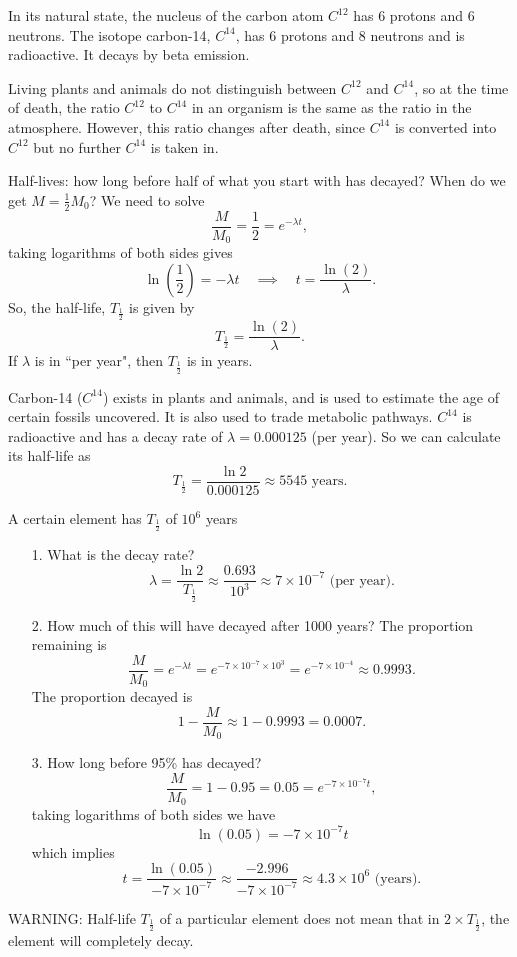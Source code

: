 In its natural state, the nucleus of the carbon atom $C^{12}$ has 6 protons and 6 neutrons. The isotope carbon-14, $C^{14}$, has 6 protons and 8 neutrons and is radioactive. It decays by beta emission.

Living plants and animals do not distinguish between $C^{12}$ and $C^{14}$, so at the time of death, the ratio $C^{12}$ to $C^{14}$ in an organism is the same as the ratio in the atmosphere. However, this ratio changes after death, since $C^{14}$ is converted into $C^{12}$ but no further $C^{14}$ is taken in.

\begin{example}
Half-lives: how long before half of what you start with has decayed? When do we get $M=\frac{1}{2}M_0$? We need to solve
\[\frac{M}{M_0}=\frac{1}{2}=e^{-\lambda t},\]
taking logarithms of both sides gives
\[\ln \left(\frac{1}{2}\right) = -\lambda t \quad \implies \quad t=\frac{\ln \left(2\right)}{\lambda}.\]
So, the half-life, $T_{\frac{1}{2}}$ is given by
\[T_{\frac{1}{2}}=\frac{\ln \left(2\right)}{\lambda}.\]
If $\lambda$ is in ``per year", then $T_{\frac{1}{2}}$ is in years.
\end{example}

\begin{example}
Carbon-14 ($C^{14}$) exists in plants and animals, and is used to estimate the age of certain fossils uncovered. It is also used to trade metabolic pathways. $C^{14}$ is radioactive and has a decay rate of $\lambda=0.000125$ (per year). So we can calculate its half-life as 
\[T_{\frac{1}{2}}=\frac{\ln 2}{0.000125}\approx 5545 \text{ years}.\]
\end{example}

\begin{example}
A certain element has $T_{\frac{1}{2}}$ of $10^6$ years
\begin{itemize} 
\item[1.] What is the decay rate?
\[\lambda=\frac{\ln 2}{T_{\frac{1}{2}}}\approx \frac{0.693}{10^3}\approx 7\times10^{-7} \text{ (per year)}.\]

\item[2.] How much of this will have decayed after 1000 years? The proportion remaining is
\[\frac{M}{M_0}=e^{-\lambda t}=e^{-7\times10^{-7}\times10^3}=e^{-7\times10^{-4}}\approx0.9993.\]
The proportion decayed is
\[1-\frac{M}{M_0}\approx1-0.9993=0.0007.\]

\item[3.] How long before 95\% has decayed?
\[\frac{M}{M_0}=1-0.95=0.05=e^{-7\times10^{-7}t},\]
taking logarithms of both sides we have
\[\ln(0.05)=-7\times10^{-7}t\]
which implies
\[t=\frac{\ln(0.05)}{-7\times 10^{-7}}\approx\frac{-2.996}{-7\times10^{-7}}\approx4.3\times10^6 \text{ (years)}.\]
\end{itemize}

WARNING: Half-life $T_{\frac{1}{2}}$ of a particular element does not mean that in $2\times T_{\frac{1}{2}}$, the element will completely decay.
\end{example}

